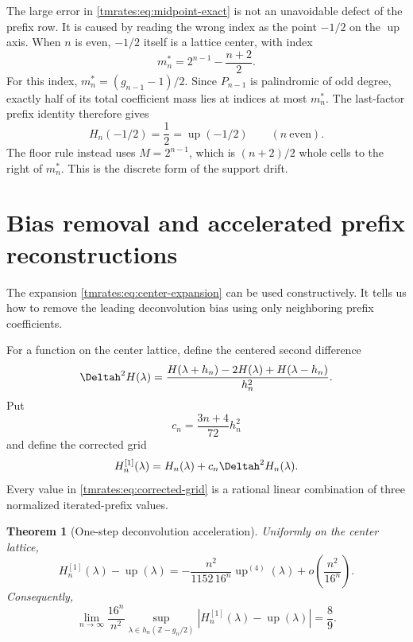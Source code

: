 \documentclass[11pt,oneside]{article}
\newtheorem{theorem}{Theorem}[section]
\theoremstyle{definition}
\theoremstyle{remark}
\newcommand{\Z}{\mathbb Z}
\newcommand{\Up}{\operatorname{up}}
\newcommand{\smallo}{o}
\begin{document}
The large error in \eqref{tmrates:eq:midpoint-exact} is not an unavoidable defect of the prefix row.
It is caused by reading the wrong index as the point $-1/2$ on the $\Up$ axis.  When $n$ is
even, $-1/2$ itself is a lattice center, with index
\begin{equation}
 m_n^*=2^{n-1}-\frac{n+2}{2}.                              \label{tmrates:eq:midpoint-correct-index}
\end{equation}
For this index, $m_n^*=(g_{n-1}-1)/2$.  Since $P_{n-1}$ is palindromic of odd degree, exactly
half of its total coefficient mass lies at indices at most $m_n^*$.  The last-factor prefix
identity therefore gives
\begin{equation}
 H_n(-1/2)=\frac12=\Up(-1/2) \qquad(n\ \text{even}).       \label{tmrates:eq:midpoint-centered-exact}
\end{equation}
The floor rule instead uses $M=2^{n-1}$, which is $(n+2)/2$ whole cells to the right of
$m_n^*$.  This is the discrete form of the support drift.

\section{Bias removal and accelerated prefix reconstructions}
\label{tmrates:sec:acceleration}

The expansion \eqref{tmrates:eq:center-expansion} can be used constructively.  It tells us how to
remove the leading deconvolution bias using only neighboring prefix coefficients.

For a function on the center lattice, define the centered second difference
\begin{equation}
 \Deltah^2H(\lambda)
 =\frac{H(\lambda+h_n)-2H(\lambda)+H(\lambda-h_n)}{h_n^2}. \label{tmrates:eq:discrete-laplacian}
\end{equation}
Put
\begin{equation}
 c_n=\frac{3n+4}{72}h_n^2
\end{equation}
and define the corrected grid
\begin{equation}
 H_n^{[1]}(\lambda)=H_n(\lambda)+c_n\Deltah^2H_n(\lambda). \label{tmrates:eq:corrected-grid}
\end{equation}
Every value in \eqref{tmrates:eq:corrected-grid} is a rational linear combination of three normalized
iterated-prefix values.

\begin{theorem}[One-step deconvolution acceleration]
\label{tmrates:thm:accelerated}
Uniformly on the center lattice,
\begin{equation}
 H_n^{[1]}(\lambda)-\Up(\lambda)
 =-\frac{n^2}{1152\,16^n}\Up^{(4)}(\lambda)
  +\smallo\!\left(\frac{n^2}{16^n}\right).                \label{tmrates:eq:accelerated-profile}
\end{equation}
Consequently,
\begin{equation}
 \lim_{n\to\infty}\frac{16^n}{n^2}
 \sup_{\lambda\in h_n(\Z-g_n/2)}
 |H_n^{[1]}(\lambda)-\Up(\lambda)|
 =\frac89.                                                 \label{tmrates:eq:accelerated-norm}
\end{equation}
\end{theorem}
\end{document}

